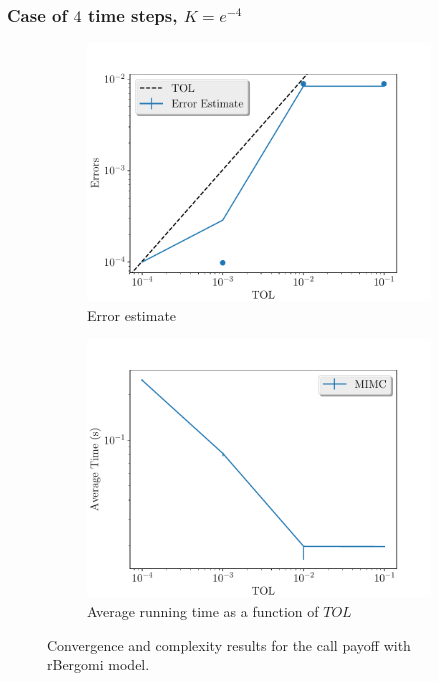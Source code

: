 \documentclass[11pt]{article}
\begin{document}
\newpage
\subsubsection*{Case of $4$ time steps, $K=e^{-4}$}
\begin{figure}[!h]
	\centering
	\begin{subfigure}{.5\textwidth}
		\centering
		\includegraphics[width=1\linewidth]{./figures/rbergomi_4_steps_K_e__4/error_estimate.pdf}
		\caption{Error estimate}
		\label{fig:misc_rbergomi_4_steps_sub1}
	\end{subfigure}%
	\begin{subfigure}{.5\textwidth}
		\centering
		\includegraphics[width=1\linewidth]{./figures/rbergomi_4_steps_K_e__4/average_running_time.pdf}
		\caption{Average running time as a function of $TOL$}
		\label{fig:misc_rbergomi_4_steps_sub2}
	\end{subfigure}%
	\caption{Convergence and complexity results for the call payoff with rBergomi model.}
	\label{fig:misc_rbergomi_4_steps_1}
\end{figure}
\end{document}
